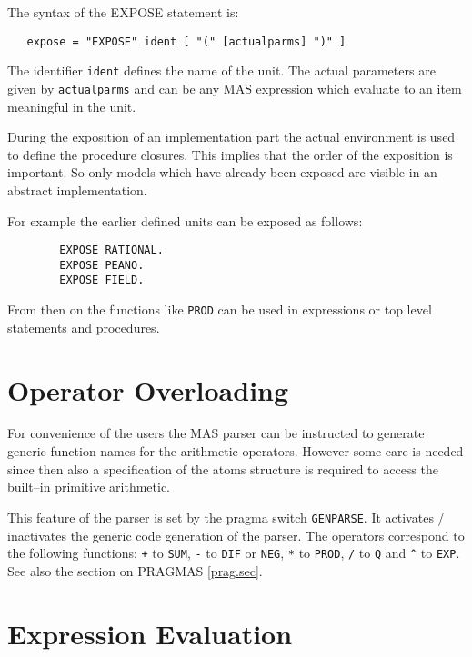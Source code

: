 The syntax of the EXPOSE statement is:
\begin{verbatim}
   expose = "EXPOSE" ident [ "(" [actualparms] ")" ]
\end{verbatim}
The identifier \verb/ident/ defines the name 
of the unit.
The actual parameters are given by \verb/actualparms/ 
and can be any MAS expression which evaluate 
to an item meaningful in the unit.

During the exposition of an implementation part 
the actual environment is used to define the 
procedure closures. This implies that the order of 
the exposition is important. 
So only models which have already been exposed are 
visible in an abstract implementation.

For example the earlier defined units can be exposed 
as follows:
\begin{verbatim}
        EXPOSE RATIONAL.
        EXPOSE PEANO.
        EXPOSE FIELD. 
\end{verbatim}
From then on the functions like \verb/PROD/ can be 
used in expressions or top level statements and procedures.


\section{Operator Overloading}

For convenience of the users the MAS parser can be 
instructed to generate generic function names for the 
arithmetic operators. However some care is needed 
since then also a specification of the atoms structure 
is required to access the built--in primitive arithmetic. 

This feature of the parser is set by the pragma switch 
\verb/GENPARSE/. It activates / inactivates 
the generic code generation of the parser.
The operators correspond to the following functions:
\verb/+/ to \verb/SUM/, 
\verb/-/ to \verb/DIF/ or \verb/NEG/, 
\verb/*/ to \verb/PROD/, \verb./. to \verb/Q/
and \verb/^/ to \verb/EXP/.
See also the section on PRAGMAS \ref{prag.sec}.
\index{\verb/+/}\index{\verb/-/}\index{\verb/*/}
\index{\verb/^/}


\section{Expression Evaluation}

